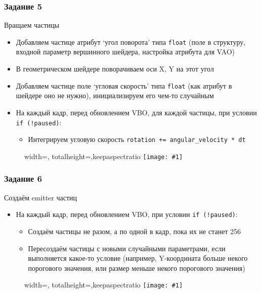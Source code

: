 \documentclass{beamer}
\newcommand{\slideimage}[1]{
  \begin{figure}
    \begin{adjustbox}{width=\textwidth, totalheight=\textheight-2\baselineskip-2\baselineskip,keepaspectratio}
      \texttt{[image: \#1]}
    \end{adjustbox}
  \end{figure}
}
\begin{document}
\begin{frame}[fragile]
\frametitle{Задание 5}
Вращаем частицы
\begin{itemize}
\item Добавляем частице атрибут `угол поворота' типа \verb|float| (поле в структуру, входной параметр вершинного шейдера, настройка атрибута для VAO)
\item В геометрическом шейдере поворачиваем оси X, Y на этот угол
\item Добавляем частице поле `угловая скорость' типа \verb|float| (как атрибут в шейдере оно не нужно), инициализируем его чем-то случайным
\item На каждый кадр, перед обновлением VBO, для каждой частицы, при условии \verb|if (!paused)|:
\begin{itemize}
\item Интегрируем угловую скорость \verb|rotation += angular_velocity * dt|
\end{itemize}
\end{itemize}
\end{frame}

\begin{frame}[fragile]
\slideimage{5.png}
\end{frame}

\begin{frame}[fragile]
\frametitle{Задание 6}
Создаём emitter частиц
\begin{itemize}
\item На каждый кадр, перед обновлением VBO, при условии \verb|if (!paused)|:
\begin{itemize}
\item Создаём частицы не разом, а по одной в кадр, пока их не станет 256
\item Пересоздаём частицы с новыми случайными параметрами, если выполняется какое-то условие (например, Y-координата больше некого порогового значения, или размер меньше некого порогового значения)
\end{itemize}
\end{itemize}
\end{frame}

\begin{frame}[fragile]
\slideimage{6.png}
\end{frame}
\end{document}
